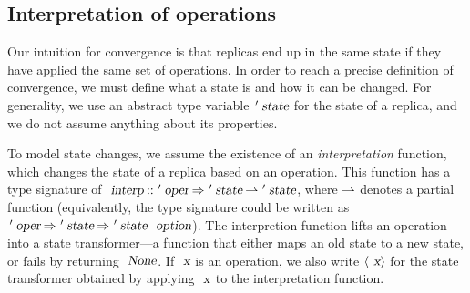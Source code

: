 \subsection{Interpretation of operations}\label{sect.ops.interpretation}

Our intuition for convergence is that replicas end up in the same state if they have applied the same set of operations.
In order to reach a precise definition of convergence, we must define what a state is and how it can be changed.
For generality, we use an abstract type variable $\isacharprime\isa{state}$ for the state of a replica, and we do not assume anything about its properties.

To model state changes, we assume the existence of an \emph{interpretation} function, which changes the state of a replica based on an operation.
This function has a type signature of $\isa{interp} \mathbin{\isacharcolon\isacharcolon} \isacharprime\isa{oper} \mathbin{\isasymRightarrow} \isacharprime\isa{state} \mathbin{\isasymrightharpoonup} \isacharprime\isa{state}$, where $\emph{$\rightharpoonup$}$ denotes a partial function (equivalently, the type signature could be written as $\isacharprime\isa{oper} \mathbin{\isasymRightarrow} \isacharprime\isa{state} \mathbin{\isasymRightarrow} \isacharprime\isa{state}\ \isa{option}$).
The interpretion function lifts an operation into a state transformer---a function that either maps an old state to a new state, or fails by returning $\isa{None}$.
If $\isa{x}$ is an operation, we also write $\langle\isa{x}\rangle$ for the state transformer obtained by applying $\isa{x}$ to the interpretation function.

